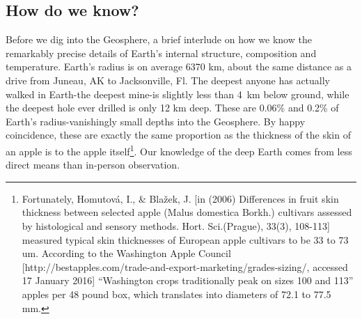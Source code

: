 \subsection{How do we know?}
Before we dig into the Geosphere, a brief interlude on how we know the remarkably precise details of Earth's internal structure, composition and temperature. Earth's radius is on average 6370 km, about the same distance as a drive from Juneau, AK to Jacksonville, Fl. The deepest anyone has actually walked in Earth-the deepest mine-is slightly less than \SI{4}{\kilo\metre} below ground, while the deepest hole ever drilled is only 12 km deep. These are 0.06\% and 0.2\% of Earth's radius-vanishingly small depths into the Geosphere. By happy coincidence, these are exactly the same proportion as the thickness of the skin of an apple is to the apple itself\footnote{Fortunately, Homutov\'{a}, I., \& Bla\v{z}ek, J. [in (2006) Differences in fruit skin thickness between selected apple (Malus domestica Borkh.) cultivars assessed by histological and sensory methods. Hort. Sci.(Prague), 33(3), 108-113] measured typical skin thicknesses of European apple cultivars to be 33 to 73 um. According to the Washington Apple Council [http://bestapples.com/trade-and-export-marketing/grades-sizing/, accessed 17 January 2016] ``Washington crops traditionally peak on sizes 100 and 113'' apples per 48 pound box, which translates into diameters of 72.1 to 77.5 mm.}. Our knowledge of the deep Earth comes from less direct means than in-person observation.\\

